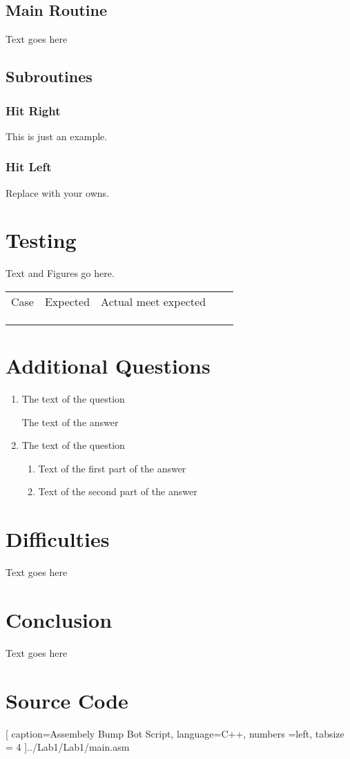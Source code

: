 \documentclass[12pt,letterpaper]{article}
\begin{document}
\subsection{Main Routine}
Text goes here

\subsection{Subroutines}
	\subsubsection{Hit Right}
	This is just an example.
	
	\subsubsection{Hit Left}
	Replace with your owns.



\section{Testing}
Text and Figures go here.
\begin{table}[h]
	\begin{tabular}{|l|l|l|ll}
		\cline{1-3}
		Case & Expected & Actual meet expected &  &  \\ \cline{1-3}
		&          &                      &  &  \\ \cline{1-3}
		&          &                      &  &  \\ \cline{1-3}
		&          &                      &  &  \\ \cline{1-3}
	\end{tabular}
\end{table}

\section{Additional Questions}
\begin{enumerate}
    \item
    The text of the question

    The text of the answer

    \item
    The text of the question
    \begin{enumerate}
        \item
        Text of the first part of the answer

        \item
        Text of the second part of the answer
    \end{enumerate}

\end{enumerate}

\section{Difficulties}
Text goes here

\section{Conclusion}
Text goes here

\section{Source Code}



[
caption=Assembely Bump Bot Script,
language=C++,
numbers =left,
tabsize = 4
]{../Lab1/Lab1/main.asm}
\end{document}
